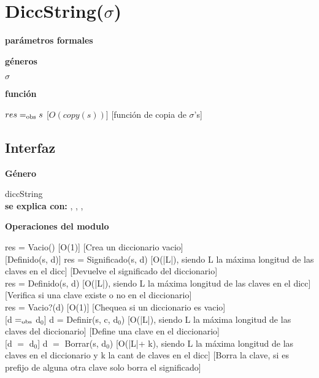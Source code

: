 \section{DiccString($\sigma$)}

\textbf{parámetros formales}\parindent\\
\parbox{1.7cm}{\textbf{géneros}}  $\sigma$\\
\parbox[t]{1.7cm}{\textbf{función}}\parbox[t]{\textwidth-2\parindent-1.7cm}{%
{$res =_{\mathrm{obs}} s$}
[$O(copy(s))$]
[función de copia de $\sigma$'s]
}

\subsection{Interfaz}

\parbox {1,7cm}{{\bf Género}} diccString\\
{\bf se explica con:}  , , , \\
\medskip

\bf{Operaciones del modulo}

{res = Vacio()}
[O(1)]
[Crea un diccionario vacio]\\

[Definido(s, d)]
{res = Significado(s, d)}
[O(|L|), siendo L la máxima longitud de las claves en el dicc]
[Devuelve el significado del diccionario]\\

{res = Definido(s, d)}
[O(|L|), siendo L la máxima longitud de las claves en el dicc]
[Verifica si una clave existe o no en el diccionario]\\

{res = Vacio?(d)}
[O(1)]
[Chequea si un diccionario es vacio]\\

[d $=_{\mathrm{obs}}$ d$_0$]
{d = Definir(s, c, d$_0$)}
[O(|L|), siendo L la máxima longitud de las claves del diccionario]
[Define una clave en el diccionario]\\

[d $=$ d$_0$]
{d $=$ Borrar(s, d$_0$)}
[O(|L|+ k), siendo L la máxima longitud de las claves en el diccionario y k la cant de claves en el dicc]
[Borra la clave, si es prefijo de alguna otra clave solo borra el significado]\\

